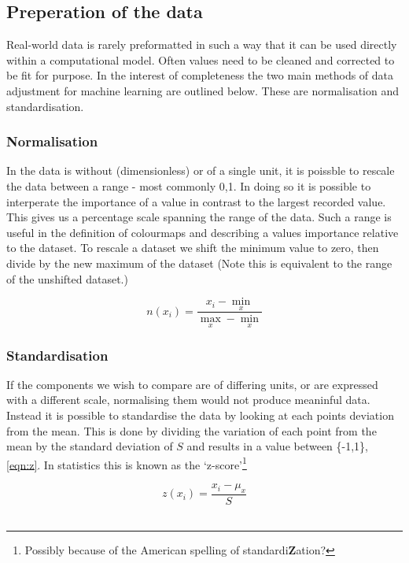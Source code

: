 \subsection{Preperation of the data}\label{sec:prep}
Real-world data is rarely preformatted in such a way that it can be used directly within a computational model. Often values need to be cleaned and corrected to be fit for purpose. In the interest of completeness the two main methods of data adjustment for machine learning are outlined below. These are normalisation and standardisation. 


\subsubsection*{Normalisation}
In the data is without (dimensionless) or of a single unit, it is poissble to rescale the data between a range - most commonly {0,1}. In doing so it is possible to interperate the importance of a value in contrast to the largest recorded value. This gives us a percentage scale spanning the range of the data. Such a range is useful in the definition of colourmaps and describing a values importance relative to the dataset. 
To rescale a dataset we shift the minimum value to zero, then divide by the new maximum of the dataset (Note this is equivalent to the range of the unshifted dataset.)

\begin{equation}
    n(x_i) = \frac{x_i - \min_x }{\max_x - \min_x}
    \label{eqn:n}
\end{equation}



\subsubsection*{Standardisation}
If the components we wish to compare are of differing units, or are expressed with a different scale, normalising them would not produce meaninful data. Instead it is possible to standardise the data by looking at each points deviation from the mean. This is done by dividing the variation of each point from the mean by the standard deviation of $S$ and results in a value between \{-1,1\}, \autoref{eqn:z}. In statistics this is known as the `z-score'\footnote{Possibly because of the American spelling of standardi\textbf{Z}ation?}

\begin{equation}
    z(x_i) = \frac{x_i - \mu_x}{S}
    \label{eqn:z}
\end{equation}\\    


